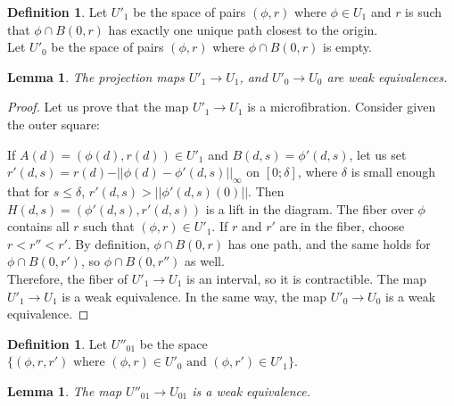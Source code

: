 \documentclass[12pt]{amsart}
\theoremstyle{plain}
\newtheorem{lem}[teo]{Lemma}
\theoremstyle{definition}
\newtheorem{defi}[teo]{Definition}
\theoremstyle{remark}
\begin{document}
\begin{defi}
    Let $U'_1$ be the space of pairs $(\phi, r)$ where $\phi \in U_1$ and $r$ is such that $\phi\cap B(0,r)$ has exactly one unique path closest to the origin.\\
    Let $U'_0$ be the space of pairs $(\phi, r)$ where $\phi\cap B(0,r)$ is empty.
\end{defi}
    
\begin{lem}
The projection maps $U'_1\rightarrow U_1$, and $U'_0\rightarrow U_0$ are weak equivalences.
\end{lem}
    
\begin{proof}
    Let us prove that the map $U'_1\rightarrow U_1$ is a microfibration. Consider given the outer square:
    \begin{center}
    \end{center}
    If $A(d) = (\phi(d),r(d)) \in U'_1$ and $B(d,s) = \phi'(d,s)$, 
    let us set $r'(d,s)= r(d) - \vert\vert \phi(d) - \phi'(d,s)\vert\vert_\infty$ on $[0;\delta]$, where $\delta$ is small enough that for $s\leq \delta$, $r'(d,s)> \vert\vert\phi'(d,s)(0)\vert\vert$.
    Then $H(d,s) = (\phi'(d,s),r'(d,s))$ is a lift in the diagram.
    The fiber over $\phi$ contains all $r$ such that $(\phi,r)\in U'_1$. 
    If $r$ and $r'$ are in the fiber, choose $r<r''<r'$.
    By definition, $\phi\cap B(0,r)$ has one path, and the same holds for $\phi\cap B(0,r')$, so $\phi\cap B(0,r'')$ as well.\\
    Therefore, the fiber of $U'_1\rightarrow U_1$ is an interval, so it is contractible.
    The map $U'_1\rightarrow U_1$ is a weak equivalence.
In the same way, the map $U'_0\rightarrow U_0$ is a weak equivalence.
\end{proof}
    
\begin{defi}
    Let $U''_{01}$ be the space $\{(\phi, r, r') \text{ where }(\phi, r)\in U'_0\text{ and }(\phi, r')\in U'_1\}$.
    \end{defi}
    
    \begin{lem}
        The map $U''_{01}\rightarrow U_{01}$ is a weak equivalence.
    \end{lem}
    
\end{document}
